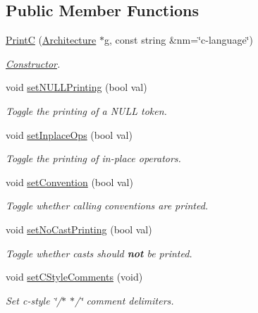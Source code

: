 \subsection*{Public Member Functions}
\begin{DoxyCompactItemize}
\item 
\mbox{\hyperlink{class_print_c_afd4f48f7193a4586ad4b6a01c8f60bc9}{PrintC}} (\mbox{\hyperlink{class_architecture}{Architecture}} $\ast$g, const string \&nm=\char`\"{}c-\/language\char`\"{})
\begin{DoxyCompactList}\small\item\em \mbox{\hyperlink{class_constructor}{Constructor}}. \end{DoxyCompactList}\item 
void \mbox{\hyperlink{class_print_c_a2394a8c394eed5b6c72b467e06949d95}{set\+N\+U\+L\+L\+Printing}} (bool val)
\begin{DoxyCompactList}\small\item\em Toggle the printing of a \textquotesingle{}N\+U\+LL\textquotesingle{} token. \end{DoxyCompactList}\item 
void \mbox{\hyperlink{class_print_c_a57ba1ad40fe3c08ab7018c6e591a67e3}{set\+Inplace\+Ops}} (bool val)
\begin{DoxyCompactList}\small\item\em Toggle the printing of {\itshape in-\/place} operators. \end{DoxyCompactList}\item 
void \mbox{\hyperlink{class_print_c_a0bb81b8247d7390388474a300873b460}{set\+Convention}} (bool val)
\begin{DoxyCompactList}\small\item\em Toggle whether calling conventions are printed. \end{DoxyCompactList}\item 
void \mbox{\hyperlink{class_print_c_a6801ebff79bee1bb2c7a413a4edcfb97}{set\+No\+Cast\+Printing}} (bool val)
\begin{DoxyCompactList}\small\item\em Toggle whether casts should {\bfseries{not}} be printed. \end{DoxyCompactList}\item 
void \mbox{\hyperlink{class_print_c_af5fb955a22b473013a2e04f69bc7715e}{set\+C\+Style\+Comments}} (void)
\begin{DoxyCompactList}\small\item\em Set c-\/style \char`\"{}/$\ast$ $\ast$/\char`\"{} comment delimiters. \end{DoxyCompactList}\item 

\end{DoxyCompactItemize}
